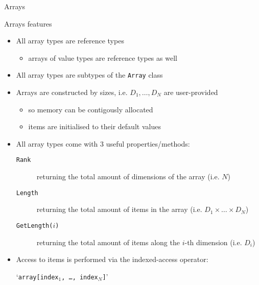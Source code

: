 \documentclass[presentation]{beamer}
\newcommand{\op}[1]{\alert{`\texttt{#1}'}}
\newcommand{\operand}[1][\ldots]{{\normalcolor#1}}
\begin{document}
\begin{frame}[shrink=5]{\dotnet Arrays}
    \begin{block}{Arrays features}
        \begin{itemize}
            \item All array types are \alert{reference} types
            \begin{itemize}
                \item arrays of value types are reference types as well
            \end{itemize}

            \item All array types are subtypes of the \texttt{Array} class

            \item Arrays are constructed by sizes, i.e. $D_1, \ldots, D_N$ are user-provided
            \begin{itemize}
                \item so memory can be contigously allocated
                \item items are initialised to their default values
            \end{itemize}

            \item All array types come with 3 useful properties/methods:
            \begin{description}
                \item[\texttt{Rank}] returning the total amount of dimensions of the array (i.e. $N$)
                \item[\texttt{Length}] returning the total amount of items in the array (i.e. $D_1 \times \ldots \times D_N$)
                \item[\texttt{GetLength($i$)}] returning the total amount of items along the $i$-th dimension (i.e. $D_i$)
            \end{description}

            \item Access to items is performed via the indexed-access operator:
            \begin{center}
                \op{\operand[array][\operand[index$_1$, \ldots, index$_N$]]}  
            \end{center}
        \end{itemize}
    \end{block}
\end{frame} 
\end{document}
